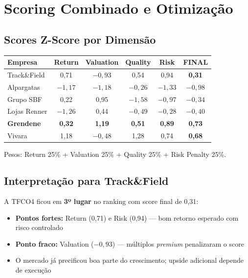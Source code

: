 \documentclass[12pt, a4paper]{article}
\begin{document}
\section{Scoring Combinado e Otimização}

\subsection{Scores Z-Score por Dimensão}

\begin{center}
\begin{tabular}{lccccc}
\toprule
\textbf{Empresa} & \textbf{Return} & \textbf{Valuation} & \textbf{Quality} & \textbf{Risk} & \textbf{FINAL} \\
\midrule
Track\&Field & 0,71 & $-0,93$ & 0,54 & 0,94 & \textbf{0,31} \\
Alpargatas & $-1,17$ & $-1,18$ & $-0,26$ & $-1,33$ & $-0,98$ \\
Grupo SBF & 0,22 & 0,95 & $-1,58$ & $-0,97$ & $-0,34$ \\
Lojas Renner & $-1,26$ & 0,44 & $-0,49$ & $-0,28$ & $-0,40$ \\
\rowcolor{cinzatabela}
\textbf{Grendene} & \textbf{0,32} & \textbf{1,19} & \textbf{0,51} & \textbf{0,89} & \textcolor{verdepositivo}{\textbf{0,73}} \\
Vivara & 1,18 & $-0,48$ & 1,28 & 0,74 & \textbf{0,68} \\
\bottomrule
\end{tabular}
\end{center}

Pesos: Return 25\% + Valuation 25\% + Quality 25\% + Risk Penalty 25\%.

\subsection{Interpretação para Track\&Field}

A TFCO4 ficou em \textbf{3º lugar} no ranking com score final de 0,31:
\begin{itemize}[leftmargin=*]
    \item \textcolor{verdepositivo}{\textbf{Pontos fortes:}} Return (0,71) e Risk (0,94) --- bom retorno esperado com risco controlado
    \item \textcolor{vermelhoneg}{\textbf{Ponto fraco:}} Valuation ($-0,93$) --- múltiplos \textit{premium} penalizaram o score
    \item O mercado já precificou boa parte do crescimento; upside adicional depende de execução
\end{itemize}
\end{document}
